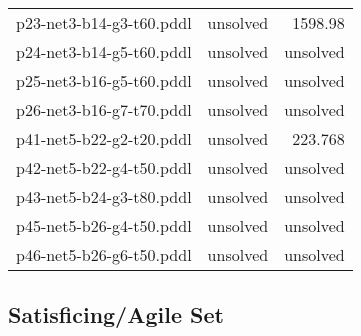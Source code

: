 \documentclass{article}
\begin{document}
\begin{center}
\begin{tabular}{r|r|r}
 p23-net3-b14-g3-t60.pddl&unsolved&1598.98\\
 p24-net3-b14-g5-t60.pddl&unsolved&unsolved\\
 p25-net3-b16-g5-t60.pddl&unsolved&unsolved\\
 p26-net3-b16-g7-t70.pddl&unsolved&unsolved\\
 p41-net5-b22-g2-t20.pddl&unsolved&223.768\\
 p42-net5-b22-g4-t50.pddl&unsolved&unsolved\\
 p43-net5-b24-g3-t80.pddl&unsolved&unsolved\\
 p45-net5-b26-g4-t50.pddl&unsolved&unsolved\\
 p46-net5-b26-g6-t50.pddl&unsolved&unsolved
                            \end{tabular}
                            \end{center}
                    

                    \subsection*{Satisficing/Agile Set}
                    
\end{document}
